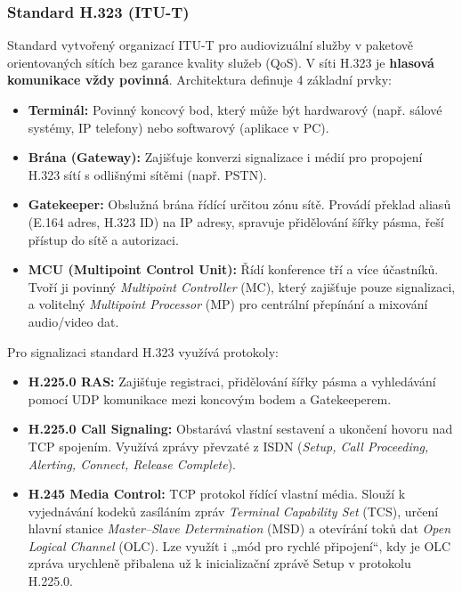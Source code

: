     \subsubsection{Standard H.323 (ITU-T)}
        Standard vytvořený organizací ITU-T pro audiovizuální služby v paketově orientovaných sítích bez garance kvality služeb (QoS). V síti H.323 je \textbf{hlasová komunikace vždy povinná}. Architektura definuje 4 základní prvky:
        \begin{itemize}
            \item \textbf{Terminál:} Povinný koncový bod, který může být hardwarový (např. sálové systémy, IP telefony) nebo softwarový (aplikace v PC).
            \item \textbf{Brána (Gateway):} Zajišťuje konverzi signalizace i médií pro propojení H.323 sítí s odlišnými sítěmi (např. PSTN).
            \item \textbf{Gatekeeper:} Obslužná brána řídící určitou zónu sítě. Provádí překlad aliasů (E.164 adres, H.323 ID) na IP adresy, spravuje přidělování šířky pásma, řeší přístup do sítě a autorizaci.
            \item \textbf{MCU (Multipoint Control Unit):} Řídí konference tří a více účastníků. Tvoří ji povinný \textit{Multipoint Controller} (MC), který zajišťuje pouze signalizaci, a volitelný \textit{Multipoint Processor} (MP) pro centrální přepínání a mixování audio/video dat.
        \end{itemize}
        Pro signalizaci standard H.323 využívá protokoly:
        \begin{itemize}
            \item \textbf{H.225.0 RAS:} Zajišťuje registraci, přidělování šířky pásma a vyhledávání pomocí UDP komunikace mezi koncovým bodem a Gatekeeperem.
            \item \textbf{H.225.0 Call Signaling:} Obstarává vlastní sestavení a ukončení hovoru nad TCP spojením. Využívá zprávy převzaté z ISDN (\textit{Setup, Call Proceeding, Alerting, Connect, Release Complete}).
            \item \textbf{H.245 Media Control:} TCP protokol řídící vlastní média. Slouží k vyjednávání kodeků zasíláním zpráv \textit{Terminal Capability Set} (TCS), určení hlavní stanice \textit{Master--Slave Determination} (MSD) a otevírání toků dat \textit{Open Logical Channel} (OLC). Lze využít i „mód pro rychlé připojení“, kdy je OLC zpráva urychleně přibalena už k inicializační zprávě Setup v protokolu H.225.0.
        \end{itemize}
